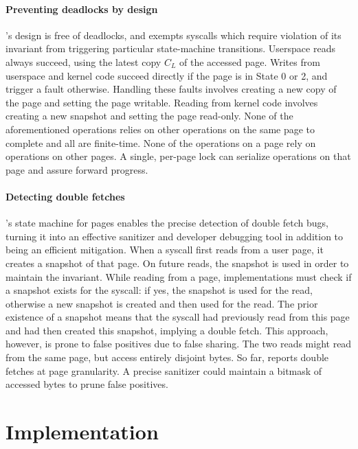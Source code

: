 \documentclass[letterpaper,twocolumn,10pt]{article}
\begin{document}
\paragraph{Preventing deadlocks by design}
\tiktok's design is free of deadlocks, and exempts syscalls which 
require violation of its invariant from triggering particular 
state-machine transitions.
Userspace reads always succeed, using the latest copy $C_L$ of the
accessed page.
Writes from userspace and kernel code succeed directly if the 
page is in State 0 or 2, and trigger a fault otherwise.
Handling these faults involves creating a new copy of the page and
setting the page writable. 
Reading from kernel code involves creating a new snapshot and 
setting the page read-only.
None of the aforementioned operations relies on other operations 
on the same page to complete and all are finite-time.
None of the operations on a page rely on operations on other pages.
A single, per-page lock can serialize operations on that page
and assure forward progress.

\paragraph{Detecting double fetches}
\tiktok's state machine for pages enables the precise detection of double fetch
bugs, turning it into an effective sanitizer and developer debugging tool in
addition to being an efficient mitigation.
When a syscall first reads from a user page, it creates a snapshot 
of that page.
On future reads, the snapshot is used in order to maintain the 
invariant.
While reading from a page, implementations must check 
if a snapshot exists for the syscall: if yes, the snapshot is used
for the read, otherwise a new snapshot is created and then used 
for the read. 
The prior existence of a snapshot means that the syscall had previously
read from this page and had then created this snapshot, implying a double 
fetch.
This approach, however, is prone to false positives due to false sharing.
The two reads might read from the same page, but access entirely 
disjoint bytes.
So far, \tiktok reports double fetches at page granularity. 
A precise sanitizer could maintain a bitmask of accessed bytes to
prune false positives.


\section{\tiktok Implementation}
\label{sec:impl}
\end{document}

